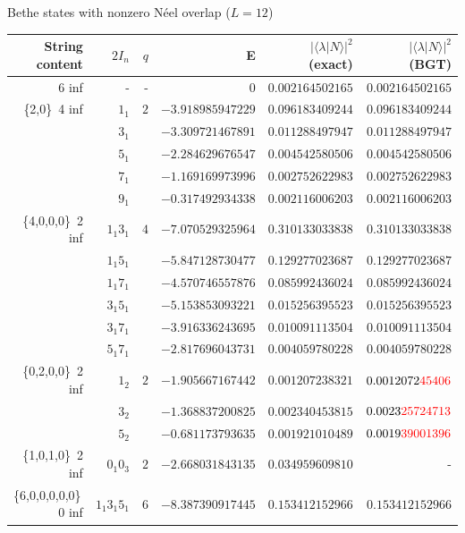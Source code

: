 \documentclass[11pt]{iopart}
\begin{document}
\begin{table}[h]
\scriptsize
\centering
Bethe states with nonzero N\'eel overlap ($L=12$)\\[1ex]
\begin{tabular}{rrrrrr}
\toprule
String content & $2I_n$ & $q$ & E & $|\langle\lambda|N\rangle|^2$ (exact) & $|\langle
\lambda|N\rangle|^2$ (BGT) \\[0.3em]
\toprule
6 inf & - & - & $0$ & $0.002164502165$ & $0.002164502165$\\
\midrule
\{2,0\}\, 4 inf &$1_1$ & $2$ & $-3.918985947229$ & $0.096183409244$ & $0.096183409244$\\
 &$3_1 $ & & $-3.309721467891$ & $0.011288497947$ &             $0.011288497947$\\
 &$5_1 $ & & $-2.284629676547$ & $0.004542580506$ &             $0.004542580506$\\
 &$7_1 $ & & $-1.169169973996$ & $0.002752622983$ &             $0.002752622983$\\
 &$9_1 $ & & $-0.317492934338$ & $0.002116006203$ &             $0.002116006203$\\
\midrule
\{4,0,0,0\}\, 2 inf &$1_1 3_1 $ & $4$ & $-7.070529325964$ & $0.310133033838$ &$0.310133033838$\\
  &$1_1 5_1 $ & & $-5.847128730477$ & $0.129277023687$ &           $0.129277023687$\\
  &$ 1_1 7_1$ & & $-4.570746557876$ & $0.085992436024$ &           $0.085992436024$\\
  &$ 3_1 5_1$ & & $-5.153853093221$ & $0.015256395523$ &           $0.015256395523$\\
  &$3_1 7_1 $ & & $-3.916336243695$ & $0.010091113504$ &           $0.010091113504$\\
  &$5_1 7_1 $ & & $-2.817696043731$ & $0.004059780228$ &           $0.004059780228$\\
\midrule
\{0,2,0,0\}\, 2 inf &$1_2 $ & $2$ & $-1.905667167442$ & $0.001207238321$ & $0.0012072{\color{red}45406}$\\
  &$3_2 $ & & $-1.368837200825$ & $0.002340453815$ &            $0.0023{\color{red}25724713}$\\
  &$5_2 $ & & $-0.681173793635$ & $0.001921010489$ &            $0.0019{\color{red}39001396}$\\
\midrule
\{1,0,1,0\}\, 2 inf &$0_1 0_3$ & $2$ & $-2.668031843135$ & $0.034959609810$ & -\\
\midrule
\{6,0,0,0,0,0\}\, 0 inf &$1_1 3_1 5_1$ & $6$ & $-8.387390917445$ & $0.153412152966$ & $0.153412152966$\\

\end{tabular}
\end{table}
\end{document}
